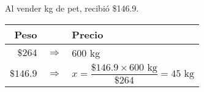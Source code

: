 Al vender \fillin[65][1cm] kg de pet, recibió \$146.9.

\begin{solutionbox}{3cm}
    \begin{tabular}{r>{\centering}p{0.2cm}l}
        \textbf{Peso} & & \textbf{Precio}\\
        \hline 
     $\$264$ & $\Rightarrow$ &  $600$ kg                                                  \\
     $\$146.9$ & $\Rightarrow$ & $x=\dfrac{\$146.9  \times 600 \text{ kg}}{\$264}=45 \text{ kg}$  \\
    \end{tabular}
    \end{solutionbox}